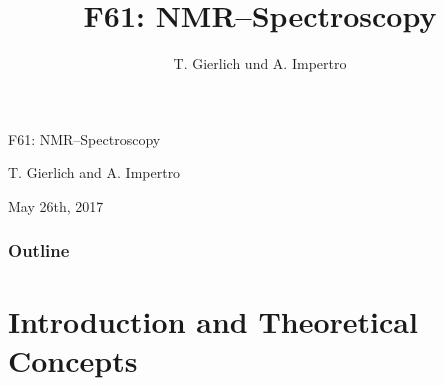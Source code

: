 \documentclass[aspectratio=169]{beamer}
\title{F61: NMR--Spectroscopy}
\author{T. Gierlich und A. Impertro}
\date{}
\begin{document}
\begin{frame}
  \begin{center}
    {\LARGE F61: NMR--Spectroscopy}
    
    \bigskip
    
    {\large T. Gierlich and A. Impertro}
        
    \bigskip
   
    {\large May 26th, 2017}
  \end{center}
\end{frame}

\begin{frame}
	\frametitle{Outline}
  	\tableofcontents
\end{frame}

\section{Introduction and Theoretical Concepts}
\end{document}

